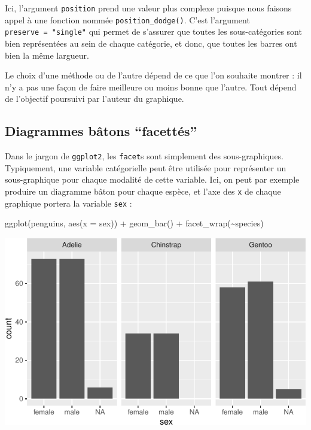 \documentclass[
  a4paper,
  DIV=11,
  numbers=noendperiod,
  oneside]{scrreprt}
\newenvironment{Shaded}{}{}
\newcommand{\AttributeTok}[1]{\textcolor[rgb]{0.84,0.23,0.29}{#1}}
\newcommand{\FunctionTok}[1]{\textcolor[rgb]{0.44,0.26,0.76}{#1}}
\newcommand{\NormalTok}[1]{\textcolor[rgb]{0.14,0.16,0.18}{#1}}
\newcommand{\SpecialCharTok}[1]{\textcolor[rgb]{0.00,0.36,0.77}{#1}}
\begin{document}
Ici, l'argument \texttt{position} prend une valeur plus complexe puisque
nous faisons appel à une fonction nommée \texttt{position\_dodge()}.
C'est l'argument \texttt{preserve\ =\ "single"} qui permet de s'assurer
que toutes les sous-catégories sont bien représentées au sein de chaque
catégorie, et donc, que toutes les barres ont bien la même largueur.

Le choix d'une méthode ou de l'autre dépend de ce que l'on souhaite
montrer : il n'y a pas une façon de faire meilleure ou moins bonne que
l'autre. Tout dépend de l'objectif poursuivi par l'auteur du graphique.

\subsection{Diagrammes bâtons
``facettés''}\label{diagrammes-buxe2tons-facettuxe9s}

Dans le jargon de \texttt{ggplot2}, les \texttt{facet}s sont simplement
des sous-graphiques. Typiquement, une variable catégorielle peut être
utilisée pour représenter un sous-graphique pour chaque modalité de
cette variable. Ici, on peut par exemple produire un diagramme bâton
pour chaque espèce, et l'axe des \texttt{x} de chaque graphique portera
la variable \texttt{sex} :

\begin{Shaded}
\begin{Highlighting}[]
\FunctionTok{ggplot}\NormalTok{(penguins, }\FunctionTok{aes}\NormalTok{(}\AttributeTok{x =}\NormalTok{ sex)) }\SpecialCharTok{+}
  \FunctionTok{geom\_bar}\NormalTok{() }\SpecialCharTok{+}
  \FunctionTok{facet\_wrap}\NormalTok{(}\SpecialCharTok{\textasciitilde{}}\NormalTok{species)}
\end{Highlighting}
\end{Shaded}

\includegraphics{03-visualization_files/figure-pdf/unnamed-chunk-61-1.pdf}
\end{document}
